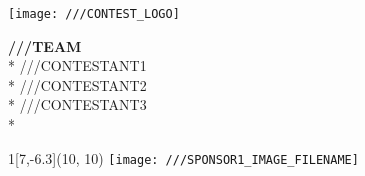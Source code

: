 \documentclass[landscape,a4paper]{letter}
\begin{document}
\pagestyle{empty}

\begin{center}

\vspace*{-4cm}
\texttt{[image: ///CONTEST\_LOGO]}

\vspace*{2cm}

{\Huge \bf ///TEAM} \\*
\vspace*{0.7cm}
{\Huge ///CONTESTANT1}\\*
\vspace*{0.5cm}
{\Huge ///CONTESTANT2}\\*
\vspace*{0.5cm}
{\Huge ///CONTESTANT3}\\*

\end{center}



\begin{textblock}{1}[7,-6.3](10, 10)
\texttt{[image: ///SPONSOR1\_IMAGE\_FILENAME]}
\end{textblock}

\newpage




\end{document}
